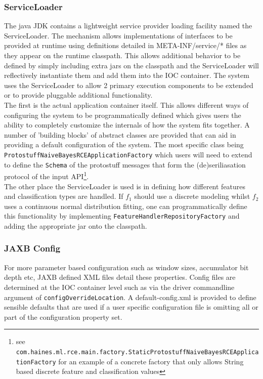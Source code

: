 \documentclass[a4paper,11pt]{scrreprt}
\begin{document}
\subsubsection{ServiceLoader}
The java JDK contains a lightweight service provider loading facility named the ServiceLoader. The mechanism allows implementations of interfaces to be provided at runtime using definitions detailed in META-INF/service/* files as they appear on the runtime classpath. This allows additional behavior to be defined by simply including extra jars on the classpath and the ServiceLoader will reflectively instantiate them and add them into the IOC container. The system uses the ServiceLoader to allow 2 primary execution components to be extended or to provide pluggable additional functionality.\\
The first is the actual application container itself. This allows different ways of configuring the system to be programmatically defined which gives users the ability to completely customize the internals of how the system fits together. A number of 'building blocks' of abstract classes are provided that can aid in providing a default configuration of the system. The most specific class being\\ \verb|ProtostuffNaiveBayesRCEApplicationFactory| which users will need to extend to define the \verb|Schema| of the protostuff messages that form the (de)seriliasation protocol of the input API\footnote{see \verb|com.haines.ml.rce.main.factory.StaticProtostuffNaiveBayesRCEApplicationFactory| for an example of a concrete factory that only allows String based discrete feature and classification values}.\\

The other place the ServiceLoader is used is in defining how different features and classification types are handled. If \(f_1\) should use a discrete modeling whilst \(f_2\) uses a continuous normal distribution fitting, one can programmatically define this functionality by implementing \verb|FeatureHandlerRepositoryFactory| and adding the appropriate jar onto the classpath. 

\subsubsection{JAXB Config}
For more parameter based configuration such as window sizes, accumulator bit depth etc, JAXB defined XML files detail these properties. Config files are determined at the IOC container level such as via the driver commandline argument of \verb|configOverrideLocation|. A default-config.xml is provided to define sensible defaults that are used if a user specific configuration file is omitting all or part of the configuration property set.
\end{document}
